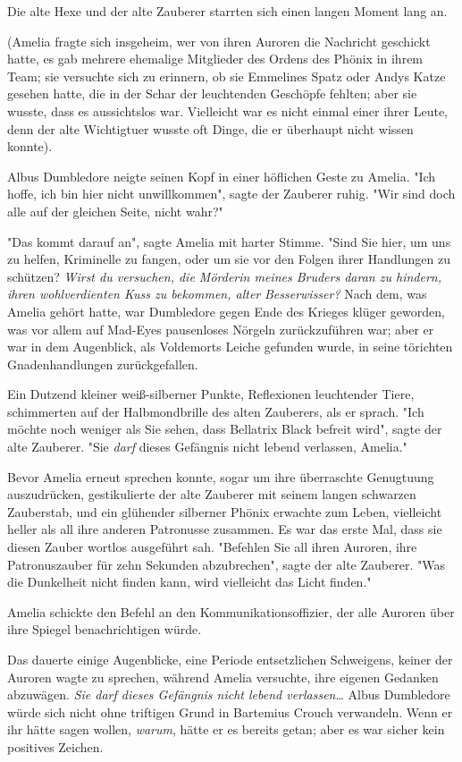 {Die alte Hexe und der alte Zauberer starrten sich einen langen Moment lang an.

(Amelia fragte sich insgeheim, wer von ihren Auroren die Nachricht geschickt hatte, es gab mehrere ehemalige Mitglieder des Ordens des Phönix in ihrem Team; sie versuchte sich zu erinnern, ob sie Emmelines Spatz oder Andys Katze gesehen hatte, die in der Schar der leuchtenden Geschöpfe fehlten; aber sie wusste, dass es aussichtslos war. Vielleicht war es nicht einmal einer ihrer Leute, denn der alte Wichtigtuer wusste oft Dinge, die er überhaupt nicht wissen konnte).

Albus Dumbledore neigte seinen Kopf in einer höflichen Geste zu Amelia. "Ich hoffe, ich bin hier nicht unwillkommen", sagte der Zauberer ruhig. "Wir sind doch alle auf der gleichen Seite, nicht wahr?"

"Das kommt darauf an", sagte Amelia mit harter Stimme. "Sind Sie hier, um uns zu helfen, Kriminelle zu fangen, oder um sie vor den Folgen ihrer Handlungen zu schützen? \emph{Wirst du versuchen, die Mörderin meines Bruders daran zu hindern, ihren wohlverdienten Kuss zu bekommen, alter} \emph{Besserwisser?} Nach dem, was Amelia gehört hatte, war Dumbledore gegen Ende des Krieges klüger geworden, was vor allem auf Mad-Eyes pausenloses Nörgeln zurückzuführen war; aber er war in dem Augenblick, als Voldemorts Leiche gefunden wurde, in seine törichten Gnadenhandlungen zurückgefallen.

Ein Dutzend kleiner weiß-silberner Punkte, Reflexionen leuchtender Tiere, schimmerten auf der Halbmondbrille des alten Zauberers, als er sprach. "Ich möchte noch weniger als Sie sehen, dass Bellatrix Black befreit wird", sagte der alte Zauberer. "Sie \emph{darf} dieses Gefängnis nicht lebend verlassen, Amelia."

Bevor Amelia erneut sprechen konnte, sogar um ihre überraschte Genugtuung auszudrücken, gestikulierte der alte Zauberer mit seinem langen schwarzen Zauberstab, und ein glühender silberner Phönix erwachte zum Leben, vielleicht heller als all ihre anderen Patronusse zusammen. Es war das erste Mal, dass sie diesen Zauber wortlos ausgeführt sah. "Befehlen Sie all ihren Auroren, ihre Patronuszauber für zehn Sekunden abzubrechen", sagte der alte Zauberer. "Was die Dunkelheit nicht finden kann, wird vielleicht das Licht finden."

Amelia schickte den Befehl an den Kommunikationsoffizier, der alle Auroren über ihre Spiegel benachrichtigen würde.

Das dauerte einige Augenblicke, eine Periode entsetzlichen Schweigens, keiner der Auroren wagte zu sprechen, während Amelia versuchte, ihre eigenen Gedanken abzuwägen. \emph{Sie darf dieses Gefängnis nicht lebend verlassen}… Albus Dumbledore würde sich nicht ohne triftigen Grund in Bartemius Crouch verwandeln. Wenn er ihr hätte sagen wollen, \emph{warum}, hätte er es bereits getan; aber es war sicher kein positives Zeichen.

}
